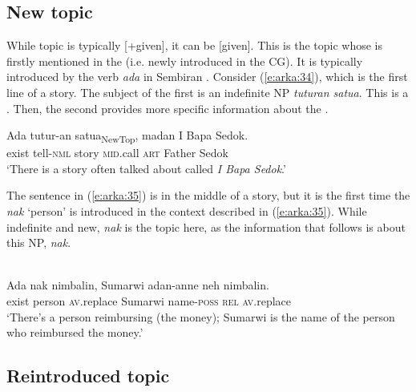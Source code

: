 \documentclass[output=paper
,modfonts
,nonflat]{langsci/langscibook}
\begin{document}
\subsection{\label{s5.2}New topic}

While topic is typically [+given], it can be [\textminus given]. This is the topic whose  is firstly mentioned in the  (i.e. newly introduced in the CG). It is typically introduced by the verb \textit{ada} in Sembiran . Consider (\ref{e:arka:34}), which is the first line of a story. The subject of the first  is an indefinite NP \textit{tuturan satua}. This is a . Then, the second  provides more specific information about the .

\begin{exe}
	\ex\label{e:arka:34}
	\gll Ada   {\ob}tutur-an   satua{\cb}\textsubscript{NewTop},   madan   I   Bapa   Sedok.\\
	exist  \phantom{[}tell-\textsc{nml}  story  \textsc{mid}.call  \textsc{art}   Father   Sedok\\
	\glt ‘There is a story often talked about called \textit{I Bapa Sedok}.’
\end{exe}

\noindent
The sentence in (\ref{e:arka:35}) is in the middle of a story, but it is the first time the  \textit{nak} ‘person’ is introduced in the context described in (\ref{e:arka:35}). While indefinite and new, \textit{nak} is the topic here, as the information that follows is about this NP, \textit{nak}.

\begin{exe}
	\label{e:arka:35}\\
	\gll Ada    nak   nimbalin,   Sumarwi   adan-anne neh   nimbalin.\\
	exist  person  \textsc{av}.replace  Sumarwi  name-\textsc{poss} \textsc{rel}  \textsc{av}.replace\\
	\glt ‘There’s a person reimbursing (the money); Sumarwi is the name of the person who reimbursed the money.’
\end{exe}

\subsection{\label{s5.3}Reintroduced topic}
\end{document}
